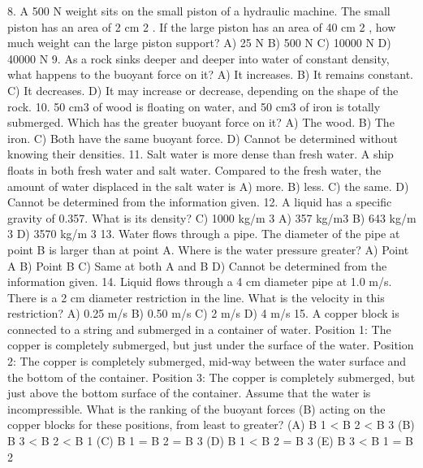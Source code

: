 8. A 500 N weight sits on the small piston of a hydraulic machine. The small piston has an area of 2 cm 2 . If the
large piston has an area of 40 cm 2 , how much weight can the large piston support?
A) 25 N
B) 500 N
C) 10000 N
D) 40000 N
9. As a rock sinks deeper and deeper into water of constant density, what happens to the buoyant force on it?
A) It increases.
B) It remains constant.
C) It decreases.
D) It may increase or decrease, depending on the shape of the rock.
10. 50 cm3 of wood is floating on water, and 50 cm3 of iron is totally submerged. Which has the greater buoyant
force on it?
A) The wood.
B) The iron.
C) Both have the same buoyant force.
D) Cannot be determined without knowing their densities.
11. Salt water is more dense than fresh water. A ship floats in both fresh water and salt water. Compared to the
fresh water, the amount of water displaced in the salt water is
A) more.
B) less.
C) the same.
D) Cannot be determined from the information given.
12. A liquid has a specific gravity of 0.357. What is its density?
C) 1000 kg/m 3
A) 357 kg/m3
B) 643 kg/m 3
D)
3570 kg/m 3
13. Water flows through a pipe. The diameter of the pipe at point B is larger than at point A. Where is the water
pressure greater?
A) Point A
B) Point B
C) Same at both A and B
D) Cannot be determined from the information given.
14. Liquid flows through a 4 cm diameter pipe at 1.0 m/s. There is a 2 cm diameter restriction in the line. What is
the velocity in this restriction?
A) 0.25 m/s
B) 0.50 m/s
C) 2 m/s
D) 4 m/s
15. A copper block is connected to a string and submerged in a container of water.
Position 1: The copper is completely submerged, but just under the surface of the water.
Position 2: The copper is completely submerged, mid-way between the water surface and the bottom of the
container.
Position 3: The copper is completely submerged, but just above the bottom surface of the container.
Assume that the water is incompressible. What is the ranking of the buoyant forces (B) acting on the copper
blocks for these positions, from least to greater?
(A) B 1 < B 2 < B 3
(B) B 3 < B 2 < B 1
(C) B 1 = B 2 = B 3
(D) B 1 < B 2 = B 3
(E) B 3 < B 1 = B 2




